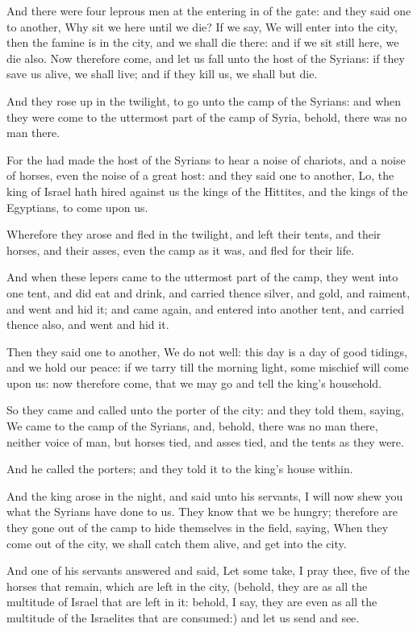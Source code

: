 \verse And there were four leprous men at the entering in of the gate: and they said one to another, Why sit we here until we die?  \verse If we say, We will enter into the city, then the famine is in the city, and we shall die there: and if we sit still here, we die also. Now therefore come, and let us fall unto the host of the Syrians: if they save us alive, we shall live; and if they kill us, we shall but die.

\verse And they rose up in the twilight, to go unto the camp of the Syrians: and when they were come to the uttermost part of the camp of Syria, behold, there was no man there.

\verse For the \LORD had made the host of the Syrians to hear a noise of chariots, and a noise of horses, even the noise of a great host: and they said one to another, Lo, the king of Israel hath hired against us the kings of the Hittites, and the kings of the Egyptians, to come upon us.

\verse Wherefore they arose and fled in the twilight, and left their tents, and their horses, and their asses, even the camp as it was, and fled for their life.

\verse And when these lepers came to the uttermost part of the camp, they went into one tent, and did eat and drink, and carried thence silver, and gold, and raiment, and went and hid it; and came again, and entered into another tent, and carried thence also, and went and hid it.

\verse Then they said one to another, We do not well: this day is a day of good tidings, and we hold our peace: if we tarry till the morning light, some mischief will come upon us: now therefore come, that we may go and tell the king's household.

\verse So they came and called unto the porter of the city: and they told them, saying, We came to the camp of the Syrians, and, behold, there was no man there, neither voice of man, but horses tied, and asses tied, and the tents as they were.

\verse And he called the porters; and they told it to the king's house within.

\verse And the king arose in the night, and said unto his servants, I will now shew you what the Syrians have done to us. They know that we be hungry; therefore are they gone out of the camp to hide themselves in the field, saying, When they come out of the city, we shall catch them alive, and get into the city.

\verse And one of his servants answered and said, Let some take, I pray thee, five of the horses that remain, which are left in the city, (behold, they are as all the multitude of Israel that are left in it: behold, I say, they are even as all the multitude of the Israelites that are consumed:) and let us send and see.

